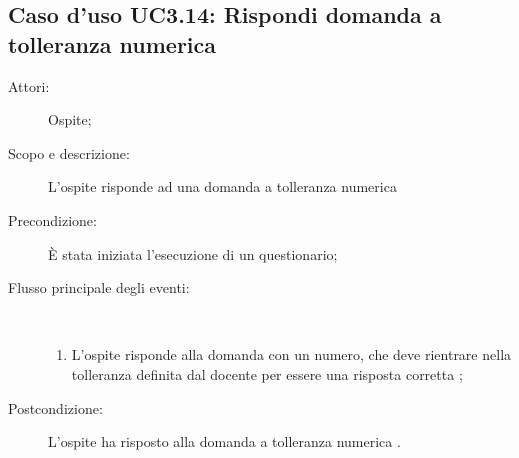 \subsection{Caso d'uso UC3.14: Rispondi domanda a tolleranza numerica}\begin{description}
	\item[Attori:] Ospite;
	\item[Scopo e descrizione:] L'ospite risponde ad una domanda a tolleranza numerica
	\item[Precondizione:] È stata iniziata l'esecuzione di un questionario;
	
	\item[Flusso principale degli eventi:] \ 
	\begin{enumerate}
		\item L'ospite risponde alla domanda con un numero, che deve rientrare nella tolleranza definita dal docente per essere una risposta corretta  ;
		
	\end{enumerate}
	\item[Postcondizione:] L'ospite ha risposto alla domanda a tolleranza numerica
	.
\end{description}
\hypertarget{UC4}{}
